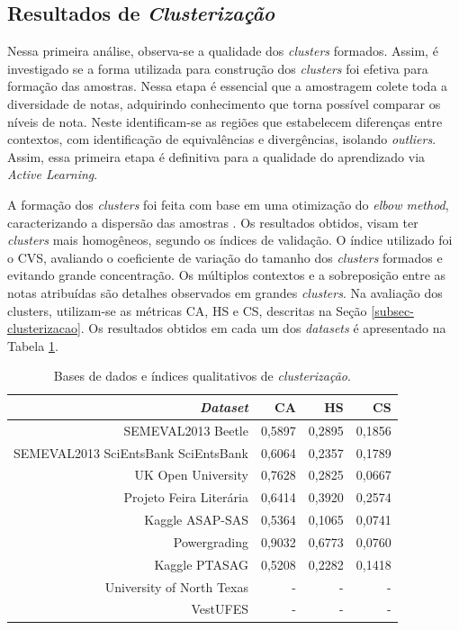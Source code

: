 \subsection{Resultados de \textit{Clusterização}}
\label{sec-res-clustering}

Nessa primeira análise, observa-se a qualidade dos \textit{clusters} formados. Assim, é investigado se a forma utilizada para construção dos \textit{clusters} foi efetiva para formação das amostras. Nessa etapa é essencial que a amostragem colete toda a diversidade de notas, adquirindo conhecimento que torna possível comparar os níveis de nota. Neste identificam-se as regiões que estabelecem diferenças entre contextos, com identificação de equivalências e divergências, isolando \textit{outliers}. Assim, essa primeira etapa é definitiva para a qualidade do aprendizado via \textit{Active Learning}.

A formação dos \textit{clusters} foi feita com base em uma otimização do \textit{elbow method}, caracterizando a dispersão das amostras \cite{spalenza2019}. Os resultados obtidos, visam ter \textit{clusters} mais homogêneos, segundo os índices de validação. O índice utilizado foi o CVS, avaliando o coeficiente de variação do tamanho dos \textit{clusters} formados e evitando grande concentração. Os múltiplos contextos e a sobreposição entre as notas atribuídas são detalhes observados em grandes \textit{clusters}. Na avaliação dos clusters, utilizam-se as métricas CA, HS e CS, descritas na Seção \ref{subsec-clusterizacao}. Os resultados obtidos em cada um dos \textit{datasets} é apresentado na Tabela \ref{tab-clstr-index}.

\begin{table}[!h]
\centering
\caption{Bases de dados e índices qualitativos de \textit{clusterização}.}
\label{tab-clstr-index}
\begin{tabular}{r | r r r }
\hline
    \textit{Dataset}  & CA & HS & CS \\ \hline 
    SEMEVAL2013 Beetle & 0,5897 & 0,2895 & 0,1856 \\
    SEMEVAL2013 SciEntsBank SciEntsBank & 0,6064 & 0,2357 & 0,1789 \\
    UK Open University  & 0,7628 & 0,2825 & 0,0667 \\
    Projeto Feira Liter{\'a}ria & 0,6414 & 0,3920 & 0,2574 \\
    Kaggle ASAP-SAS  & 0,5364 & 0,1065 & 0,0741 \\
    Powergrading & 0,9032 & 0,6773 & 0,0760 \\
    Kaggle PTASAG  & 0,5208 & 0,2282 & 0,1418 \\
    University of North Texas & - & - & - \\
    VestUFES & - & - & - \\
\hline
\hline
\end{tabular}
\end{table}

